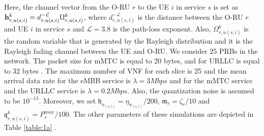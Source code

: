 \documentclass[lettersize,journal]{IEEEtran}
\begin{document}
Here, the channel vector from the O-RU $r$ to the UE $i$ in service $s$ is set as $\bold{h}_{r,u(s,i)}^{k}=d_{r,u(s,i)}^{-\mathcal{L}} \Omega_{r,u(s,i)}^{k} $, where $d_{r,u(s,i)}^{-\mathcal{L}} $ is the distance between the O-RU $r$ and UE $i$ in service $s$ and $\mathcal{L} = 3.8$ is the path-loss exponent.%
Also, $\Omega_{r,u(s,i)}^{k}$ is the random variable that is generated by the Rayleigh distribution and it is the Rayleigh fading channel between the UE and O-RU.
We consider 25 PRBs in the network. The packet size for mMTC is equal to 20 bytes, and for URLLC is equal to 32 bytes \cite{ETSI1}.
The maximum number of VNF for each slice is 25 and the mean arrival data rate for the eMBB service is $\lambda  = 3Mbps$ and for the mMTC service and the URLLC  service is $\lambda  = 0.2Mbps$.
Also, the quantization noise is assumed to be $10^{-13}$.
Moreover, we set $\mathfrak{h}_{u_{(s,i)}} = \eta_{u_{(s,i)}}/200$, $\mathfrak{m}_{r} = \zeta_r/10$
and $\mathfrak{q}^k_{r,u(s,i)} = P_{s}^{max}/100$. The other parameters of these simulations are depicted in Table \ref{table:1a} \cite{3GPPTS1, 3GPPTS2,IMT, ETSI1}.%
\end{document}
